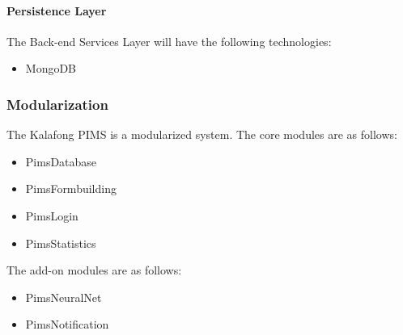\paragraph{Persistence Layer}\newline
The Back-end Services Layer will have the following technologies:
\begin{itemize}
	\item MongoDB
\end{itemize}


\subsubsection{Modularization}
The Kalafong PIMS is a modularized system.
The core modules are as follows:
\begin{itemize}
	\item PimsDatabase
	\item PimsFormbuilding
	\item PimsLogin	
	\item PimsStatistics	
\end{itemize}
The add-on modules are as follows:
\begin{itemize}
	\item PimsNeuralNet
	\item PimsNotification	
\end{itemize}